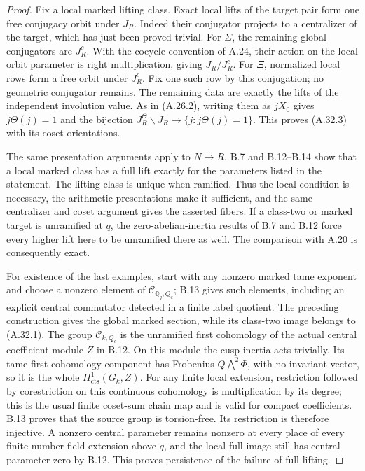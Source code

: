 \begin{proof}
Fix a local marked lifting
class. Exact local lifts of
the target pair form one
free conjugacy orbit under
$J_R$. Indeed their conjugator
projects to a centralizer of
the target, which has just
been proved trivial. For
$\Sigma$, the remaining
global conjugators are
$J_R^c$. With the cocycle
convention of A.24, their
action on the local orbit
parameter is right multiplication,
giving $J_R/J_R^c$.
For $\Xi$, normalized local
rows form a free orbit under
$J_R^c$. Fix one such row
by this conjugation; no
geometric conjugator remains.
The remaining data are exactly
the lifts of the independent
involution value. As in
(A.26.2), writing them as
$jX_0$ gives $j\Theta(j)=1$
and the bijection
$J_R^\Theta\backslash J_R
\to\{j:j\Theta(j)=1\}$.
This proves (A.32.3) with
its coset orientations.

The same presentation arguments
apply to $N\to R$. B.7 and
B.12--B.14 show that a local
marked class has a full lift
exactly for the parameters
listed in the statement.
The lifting class is unique
when ramified. Thus the local
condition is necessary, the
arithmetic presentations make
it sufficient, and the same
centralizer and coset argument
gives the asserted fibers.
If a class-two or marked
target is unramified at $q$,
the zero-abelian-inertia results
of B.7 and B.12 force every
higher lift here to be
unramified there as well.
The comparison with A.20
is consequently exact.

For existence of the last
examples, start with any
nonzero marked tame exponent
and choose a nonzero element
of $\mathcal C_{\mathbb Q_q,Q_c}$;
B.13 gives such elements,
including an explicit central
commutator detected in a
finite label quotient. The
preceding construction gives
the global marked section,
while its class-two image
belongs to (A.32.1).
The group $\mathcal C_{k,Q_c}$
is the unramified first
cohomology of the actual
central coefficient module
$Z$ in B.12. On this module
the cusp inertia acts trivially.
Its tame first-cohomology
component has Frobenius
$Q\bigwedge^2\Phi$, with
no invariant vector, so
it is the whole
$H^1_{\mathrm{cts}}(G_k,Z)$.
For any finite local extension,
restriction followed by
corestriction on this continuous
cohomology is multiplication
by its degree; this is the
usual finite coset-sum chain
map and is valid for compact
coefficients. B.13 proves
that the source group is
torsion-free. Its restriction
is therefore injective.
A nonzero central parameter
remains nonzero at every
place of every finite
number-field extension above
$q$, and the local full
image still has central
parameter zero by B.12.
This proves persistence of
the failure of full lifting.
\end{proof}


